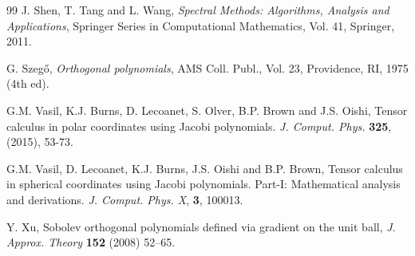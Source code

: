 \documentclass{amsart}
\theoremstyle{plain}%
\theoremstyle{definition}
\theoremstyle{remark}
\begin{document}
\begin{thebibliography}{99}
         J. Shen, T. Tang and L. Wang,
         {\it Spectral Methods: Algorithms, Analysis and Applications}, 
         Springer Series in Computational Mathematics, Vol. 41, 
         Springer, 2011. 


         G. Szeg\H{o}, 
         \textit{Orthogonal polynomials}, 
         AMS Coll. Publ., Vol. 23, Providence, RI, 1975 (4th ed).

      G.M. Vasil, K.J. Burns, D. Lecoanet, S. Olver, B.P. Brown and J.S. Oishi,  
      Tensor calculus in polar coordinates using Jacobi polynomials. 
      \textit{J. Comput. Phys.} \textbf{325}, (2015), 53-73.

      G.M. Vasil, D. Lecoanet, K.J. Burns, J.S. Oishi and B.P. Brown,  
      Tensor calculus in spherical coordinates using Jacobi polynomials. Part-I: Mathematical analysis and derivations. 
      \textit{J. Comput. Phys. X}, \textbf{3}, 100013.

      Y. Xu,
      Sobolev orthogonal polynomials defined via gradient on the unit ball,  
      \textit{J. Approx. Theory}  \textbf{152} (2008) 52--65.

\end{thebibliography}
\end{document}
